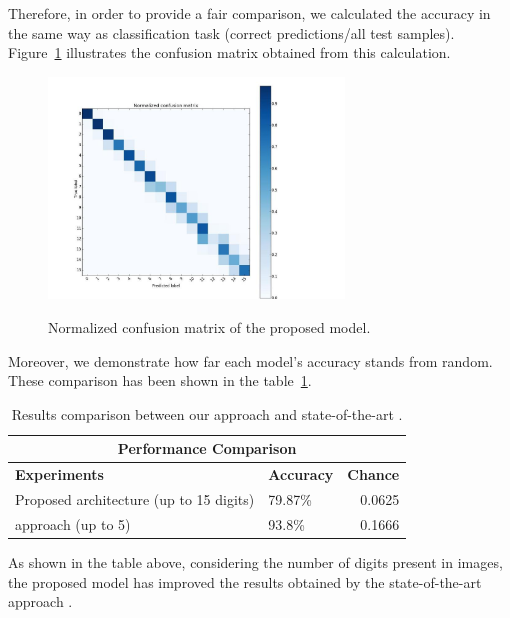 \indent Therefore, in order to provide a fair comparison, we calculated the accuracy in the same way as classification task (correct predictions/all test samples). Figure~\ref{conf} illustrates the confusion matrix obtained from this calculation. 
\begin{figure}[H]
	\centering
	{\includegraphics[width=0.7\textwidth]{images/normCM}}
	\caption{Normalized confusion matrix of the proposed model.}
	\label{conf}
\end{figure}

 Moreover, we demonstrate how far each model's accuracy stands from random. These comparison has been shown in the table~\ref{tab:comp}.

\begin{table}[H]
\centering
\small\sffamily
\begin{tabular}{llr}
\multicolumn{3}{c}{\textbf{\textbf{Performance Comparison}}} \\
\bottomrule
\textbf{Experiments}  &   \textbf{Accuracy} & \textbf{Chance} \\
\bottomrule
Proposed architecture (up to 15 digits)     & 79.87\% & 0.0625 \\
\citet{segui2015learning} approach (up to 5)& 93.8\% & 0.1666  \\

\bottomrule
\end{tabular}
\caption{Results comparison between our approach and state-of-the-art \cite{segui2015learning}.}
\label{tab:comp}
\end{table} 

As shown in the table above, considering the number of digits present in images, the proposed model has improved the results obtained by the state-of-the-art approach \cite{segui2015learning}.

